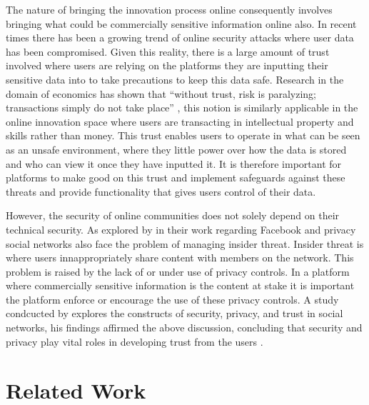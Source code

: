 The nature of bringing the innovation process online consequently involves bringing what could be commercially sensitive information online also. In recent times there has been a growing trend of online security attacks where user data has been compromised. Given this reality, there is a large amount of trust involved where users are relying on the platforms they are inputting their sensitive data into to take precautions to keep this data safe. Research in the domain of economics has shown that ``without trust, risk is paralyzing; transactions simply do not take place'' \cite{boyd2002community}, this notion is similarly applicable in the online innovation space where users are transacting in intellectual property and skills rather than money. This trust enables users to operate in what can be seen as an unsafe environment, where they little power over how the data is stored and who can view it once they have inputted it. It is therefore important for platforms to make good on this trust and implement safeguards against these threats and provide functionality that gives users control of their data.
\par
However, the security of online communities does not solely depend on their technical security. As explored by \citeauthor{johnson2012facebook} in their work regarding Facebook and privacy \cite{johnson2012facebook} social networks also face the problem of managing insider threat. Insider threat is where users innappropriately share content with members on the network. This problem is raised by the lack of or under use of privacy controls. In a platform where commercially sensitive information is the content at stake it is important the platform enforce or encourage the use of these privacy controls. A study condcucted by \citeauthor{shin2010effects} explores the constructs of security, privacy, and trust in social networks, his findings affirmed the above discussion, concluding that security and privacy play vital roles in developing trust from the users \cite{shin2010effects}.

\section{Related Work}

